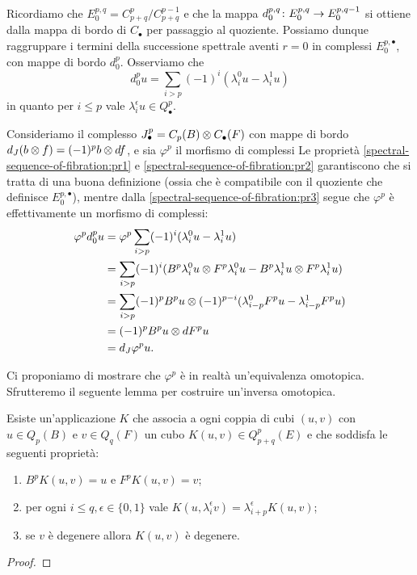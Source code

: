 Ricordiamo che $E^{p,q}_0=C^p_{p+q}/C^{p-1}_{p+q}$ e che la mappa $d^{p,q}_0\colon E^{p,q}_0\to E^{p,q-1}_0$ si ottiene dalla mappa di bordo di $C_\bullet$ per passaggio al quoziente. Possiamo dunque raggruppare i termini della successione spettrale aventi $r=0$ in complessi $E^{p,\bullet}_0$, con mappe di bordo $d^p_0$. Osserviamo che
$$
d^p_0u=\sum_{i>p}(-1)^i(\lambda^0_iu-\lambda^1_iu)
$$
in quanto per $i\le p$ vale $\lambda^\epsilon_iu\in Q^p_\bullet$.

Consideriamo il complesso $J^p_\bullet=C_p(B)\mathbin{\otimes} C_\bullet(F)$ con mappe di bordo $d_J(b\mathbin{\otimes} f)=(-1)^pb\mathbin{\otimes} df$, e sia $\varphi^p$ il morfismo di complessi
Le proprietà \ref{spectral-sequence-of-fibration:pr1} e \ref{spectral-sequence-of-fibration:pr2} garantiscono che si tratta di una buona definizione (ossia che è compatibile con il quoziente che definisce $E^{p,\bullet}_0$), mentre dalla \ref{spectral-sequence-of-fibration:pr3} segue che $\varphi^p$ è effettivamente un morfismo di complessi:
\begin{align*}
\varphi^pd^p_0u&=\varphi^p\sum_{i>p}(-1)^i(\lambda^0_iu-\lambda^1_iu)\\
&=\sum_{i>p}(-1)^i(B^p\lambda^0_iu\mathbin{\otimes} F^p\lambda^0_iu-B^p\lambda^1_iu\mathbin{\otimes} F^p\lambda^1_iu)\\
&=\sum_{i>p}(-1)^pB^pu\mathbin{\otimes}(-1)^{p-i}(\lambda^0_{i-p}F^pu-\lambda^1_{i-p}F^pu)\\
&=(-1)^pB^pu\mathbin{\otimes} dF^pu\\
&=d_J\varphi^pu.
\end{align*}

Ci proponiamo di mostrare che $\varphi^p$ è in realtà un'equivalenza omotopica. Sfrutteremo il seguente lemma per costruire un'inversa omotopica.

\begin{lemma}
Esiste un'applicazione $K$ che associa a ogni coppia di cubi $(u,v)$ con $u\in Q_p(B)$ e $v\in Q_q(F)$ un cubo $K(u,v)\in Q^p_{p+q}(E)$ e che soddisfa le seguenti proprietà:
\begin{enumerate}
\item $B^pK(u,v)=u$ e $F^pK(u,v)=v$;
\item per ogni $i\le q,\epsilon\in\{0,1\}$ vale $K(u,\lambda^\epsilon_iv)=\lambda^\epsilon_{i+p}K(u,v)$;
\item se $v$ è degenere allora $K(u,v)$ è degenere.
\end{enumerate}
\end{lemma}
\begin{proof}

\end{proof}